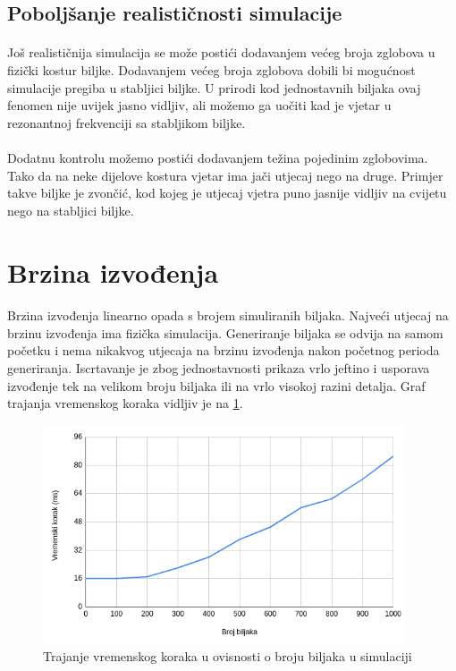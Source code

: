 \documentclass[times, utf8, diplomski]{fer}
\begin{document}
\subsection{Poboljšanje realističnosti simulacije}
\paragraph{}
Još realističnija simulacija se može postići dodavanjem većeg broja zglobova u
fizički kostur biljke. Dodavanjem većeg broja zglobova dobili bi mogućnost 
simulacije pregiba u stabljici biljke. U prirodi kod jednostavnih biljaka ovaj 
fenomen nije uvijek jasno vidljiv, ali možemo ga uočiti kad je vjetar u 
rezonantnoj frekvenciji sa stabljikom biljke.
\paragraph{}
Dodatnu kontrolu možemo postići dodavanjem težina pojedinim zglobovima. Tako da 
na neke dijelove kostura vjetar ima jači utjecaj nego na druge. Primjer takve 
biljke je zvončić, kod kojeg je utjecaj vjetra puno jasnije vidljiv na cvijetu 
nego na stabljici biljke.

\section{Brzina izvođenja}
\paragraph{}
Brzina izvođenja linearno opada s brojem simuliranih biljaka. Najveći utjecaj na 
brzinu izvođenja ima fizička simulacija. Generiranje biljaka se odvija na samom 
početku i nema nikakvog utjecaja na brzinu izvođenja nakon početnog perioda 
generiranja. Iscrtavanje je zbog jednostavnosti prikaza vrlo jeftino i usporava
izvođenje tek na velikom broju biljaka ili na vrlo visokoj razini detalja. Graf trajanja 
vremenskog koraka vidljiv je na \ref{fig:53-1}.

\begin{figure}[h]
	\centering
	\includegraphics[width=0.95\textwidth]{img/53-1}
	\caption{Trajanje vremenskog koraka u ovisnosti o broju biljaka u simulaciji}
	\label{fig:53-1}
\end{figure}
\end{document}

